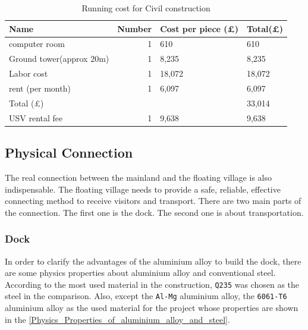\documentclass[11pt]{article}
\numberwithin{equation}{section}
\begin{document}
\begin{table}[H]
\caption{\label{CivilConstruction}Running cost for Civil construction}
\centering
\begin{tabular}{lrll}
\toprule
Name & Number & Cost per piece (\pounds) & Total(\pounds)\\
\midrule
computer room & 1 & 610 & 610\\
Ground tower(approx 20m) & 1 & 8,235 & 8,235\\
Labor cost & 1 & 18,072 & 18,072\\
rent (per month) & 1 & 6,097 & 6,097\\
\midrule
Total (\pounds) &  &  & 33,014\\
\midrule
USV rental fee & 1 & 9,638 & 9,638\\
\bottomrule
\end{tabular}
\end{table}

\subsection{Physical Connection}
\label{sec:org3721f20}
The real connection between the mainland and the floating village is also indispensable. The floating village needs to provide a safe, reliable, effective connecting method to receive visitors and transport. There are two main parts of the connection. The first one is the dock. The second one is about transportation.

\subsubsection{Dock}
\label{sec:org91cab5b}
In order to clarify the advantages of the aluminium alloy to build the dock, there are some physics properties about aluminium alloy and conventional steel. According to the most used material in the construction, \texttt{Q235} was chosen as the steel in the comparison. Also, except the \texttt{Al-Mg} aluminium alloy, the \texttt{6061-T6} aluminium alloy as the used material for the project whose properties are shown in the  \ref{Physics_Properties_of_aluminium_alloy_and_steel}.
\end{document}
